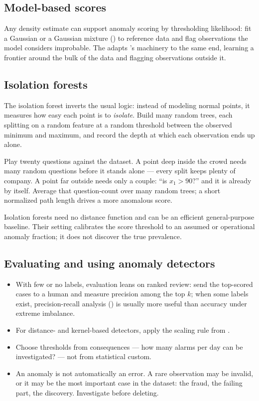 \subsection{Model-based scores}

Any density estimate can support anomaly scoring by thresholding likelihood: fit a Gaussian or a Gaussian mixture () to reference data and flag observations the model considers improbable. The  adapts 's machinery to the same end, learning a frontier around the bulk of the data and flagging observations outside it.

\subsection{Isolation forests}
\label{sec:isolation-forest}

The isolation forest inverts the usual logic: instead of modeling normal points, it measures how easy each point is to \emph{isolate}. Build many random trees, each splitting on a random feature at a random threshold between the observed minimum and maximum, and record the depth at which each observation ends up alone.

\begin{intuition}
Play twenty questions against the dataset. A point deep inside the crowd needs many random questions before it stands alone --- every split keeps plenty of company. A point far outside needs only a couple: ``is $x_1>90$?'' and it is already by itself. Average that question-count over many random trees; a short normalized path length drives a more anomalous score.
\end{intuition}

Isolation forests need no distance function and can be an efficient general-purpose baseline. Their  setting calibrates the score threshold to an assumed or operational anomaly fraction; it does not discover the true prevalence.

\subsection{Evaluating and using anomaly detectors}

\begin{itemize}
  \item With few or no labels, evaluation leans on ranked review: send the top-scored cases to a human and measure precision among the top $k$; when some labels exist, precision-recall analysis () is usually more useful than accuracy under extreme imbalance.
  \item For distance- and kernel-based detectors, apply the scaling rule from .
  \item Choose thresholds from consequences --- how many alarms per day can be investigated? --- not from statistical custom.
  \item An anomaly is not automatically an error. A rare observation may be invalid, or it may be the most important case in the dataset: the fraud, the failing part, the discovery. Investigate before deleting.
\end{itemize}

